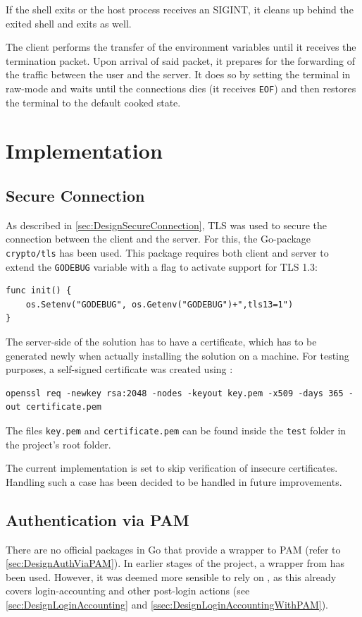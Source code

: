 \documentclass[10pt,a4paper,titlepage,twoside,english,final]{zhawreprt}
\begin{document}
If the \gls{shell} exits or the host process receives an \gls{SIGINT}, it cleans up behind the exited \gls{shell} and exits as well.

The client performs the transfer of the environment variables until it receives the termination packet. Upon arrival of said packet, it prepares for the forwarding of the traffic between the user and the server. It does so by setting the \gls{terminal} in raw-mode and waits until the connections dies (it receives \texttt{EOF}) and then restores the \gls{terminal} to the default cooked state.


\chapter{Implementation}\label{chp:Implementation}
\section{Secure Connection}\label{sec:ImplSecureConnection}
As described in \ref{sec:DesignSecureConnection}, \gls{TLS} was used to secure the connection between the client and the server. For this, the \gls{Go}-package \texttt{crypto/tls} has been used. This package requires both client and server to extend the \texttt{GODEBUG} variable with a flag to activate support for \gls{TLS} 1.3:
\setlistingGo
\begin{lstlisting}[caption={Activating \gls{TLS} 1.3 in \gls{Go}},label=lst:TlsInGo]
func init() {
    os.Setenv("GODEBUG", os.Getenv("GODEBUG")+",tls13=1")
}
\end{lstlisting}
The server-side of the solution has to have a certificate, which has to be generated newly when actually installing the solution on a machine. For testing purposes, a self-signed certificate was created using \cite{openssl}:
\setlistingBash
\begin{lstlisting}[caption={Generating a self-signed certificate and private key},label=lst:GenCertNKey]
openssl req -newkey rsa:2048 -nodes -keyout key.pem -x509 -days 365 -out certificate.pem
\end{lstlisting}
The files \texttt{key.pem} and \texttt{certificate.pem} can be found inside the \texttt{test} folder in the project's root folder.

The current implementation is set to skip verification of insecure certificates. Handling such a case has been decided to be handled in future improvements.

\section{Authentication via PAM}\label{sec:ImplAuthViaPAM}
There are no official packages in \gls{Go} that provide a wrapper to \gls{PAM} (refer to \ref{sec:DesignAuthViaPAM}). In earlier stages of the project, a wrapper from \cite{gopam} has been used. However, it was deemed more sensible to rely on \cite{login}, as this already covers login-accounting and other post-login actions (see \ref{sec:DesignLoginAccounting} and \ref{ssec:DesignLoginAccountingWithPAM}).
\end{document}
